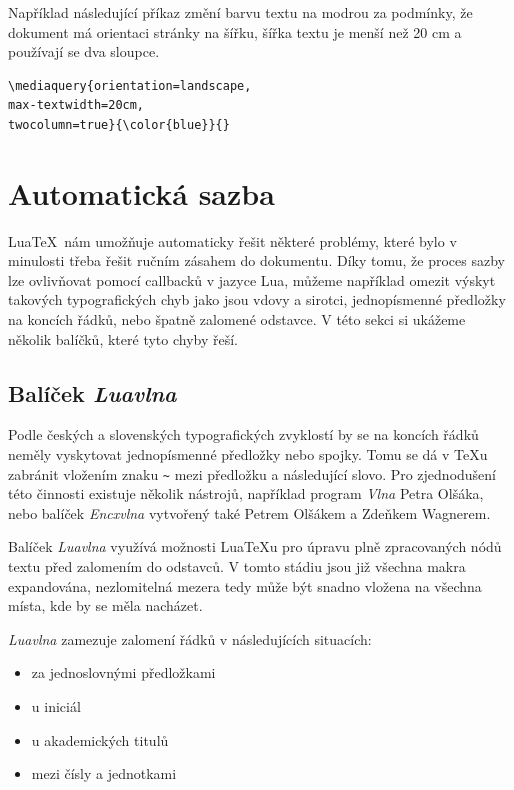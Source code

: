 \documentclass{csbulletin}
\newcommand\balicek[1]{\textit{#1}}
\begin{document}
Například následující příkaz změní barvu textu na modrou za podmínky, že dokument 
má orientaci stránky na šířku, šířka textu je menší než 20 cm a používají se dva sloupce.

\begin{verbatim}
\mediaquery{orientation=landscape,
max-textwidth=20cm,
twocolumn=true}{\color{blue}}{}
\end{verbatim}


\section{Automatická sazba}

Lua\TeX\ nám umožňuje automaticky řešit některé problémy, které bylo v
minulosti třeba řešit ručním zásahem do dokumentu. Díky tomu, že proces sazby
lze ovlivňovat pomocí callbacků v jazyce Lua, můžeme například omezit výskyt
takových typografických chyb jako jsou vdovy a sirotci, jednopísmenné předložky
na koncích řádků, nebo špatně zalomené odstavce. V této sekci si ukážeme
několik balíčků, které tyto chyby řeší.





\subsection{Balíček \balicek{Luavlna}}

Podle českých a slovenských typografických zvyklostí by se na koncích řádků
neměly vyskytovat jednopísmenné předložky nebo spojky. 
Tomu se dá v \TeX u zabránit vložením znaku \verb|~| mezi předložku a
následující slovo. Pro zjednodušení této činnosti existuje
několik nástrojů, například program \balicek{Vlna} Petra Olšáka, nebo balíček
\balicek{Encxvlna} vytvořený také Petrem Olšákem a Zdeňkem Wagnerem.

Balíček \balicek{Luavlna} \cite{luavlna} využívá možnosti Lua\TeX u pro úpravu
plně zpracovaných nódů textu před zalomením do odstavců. 
V tomto stádiu jsou již všechna makra expandována, nezlomitelná mezera
tedy může být snadno vložena na všechna místa, kde by se měla nacházet.

\balicek{Luavlna} zamezuje zalomení řádků v následujících situacích:

\begin{itemize}
  \item za jednoslovnými předložkami
  \item u iniciál
  \item u akademických titulů
  \item mezi čísly a jednotkami
\end{itemize}
  
\end{document}
